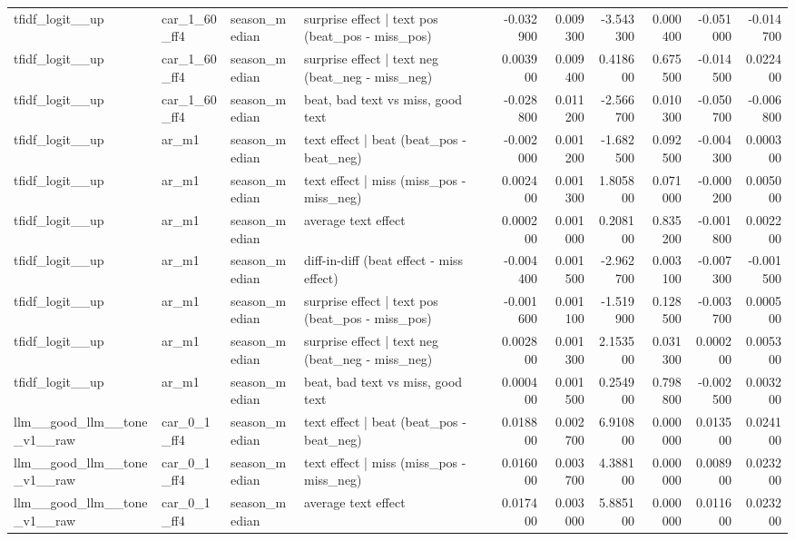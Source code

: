 \begin{table}
\begin{tabular}{llllrrrrrr}
tfidf\_logit\_\_up & car\_1\_60\_ff4 & season\_median & surprise effect | text pos (beat\_pos - miss\_pos) & -0.032900 & 0.009300 & -3.543300 & 0.000400 & -0.051000 & -0.014700 \\
tfidf\_logit\_\_up & car\_1\_60\_ff4 & season\_median & surprise effect | text neg (beat\_neg - miss\_neg) & 0.003900 & 0.009400 & 0.418600 & 0.675500 & -0.014500 & 0.022400 \\
tfidf\_logit\_\_up & car\_1\_60\_ff4 & season\_median & beat, bad text vs miss, good text & -0.028800 & 0.011200 & -2.566700 & 0.010300 & -0.050700 & -0.006800 \\
tfidf\_logit\_\_up & ar\_m1 & season\_median & text effect | beat  (beat\_pos - beat\_neg) & -0.002000 & 0.001200 & -1.682500 & 0.092500 & -0.004300 & 0.000300 \\
tfidf\_logit\_\_up & ar\_m1 & season\_median & text effect | miss  (miss\_pos - miss\_neg) & 0.002400 & 0.001300 & 1.805800 & 0.071000 & -0.000200 & 0.005000 \\
tfidf\_logit\_\_up & ar\_m1 & season\_median & average text effect & 0.000200 & 0.001000 & 0.208100 & 0.835200 & -0.001800 & 0.002200 \\
tfidf\_logit\_\_up & ar\_m1 & season\_median & diff-in-diff (beat effect - miss effect) & -0.004400 & 0.001500 & -2.962700 & 0.003100 & -0.007300 & -0.001500 \\
tfidf\_logit\_\_up & ar\_m1 & season\_median & surprise effect | text pos (beat\_pos - miss\_pos) & -0.001600 & 0.001100 & -1.519900 & 0.128500 & -0.003700 & 0.000500 \\
tfidf\_logit\_\_up & ar\_m1 & season\_median & surprise effect | text neg (beat\_neg - miss\_neg) & 0.002800 & 0.001300 & 2.153500 & 0.031300 & 0.000200 & 0.005300 \\
tfidf\_logit\_\_up & ar\_m1 & season\_median & beat, bad text vs miss, good text & 0.000400 & 0.001500 & 0.254900 & 0.798800 & -0.002500 & 0.003200 \\
llm\_\_good\_llm\_\_tone\_v1\_\_raw & car\_0\_1\_ff4 & season\_median & text effect | beat  (beat\_pos - beat\_neg) & 0.018800 & 0.002700 & 6.910800 & 0.000000 & 0.013500 & 0.024100 \\
llm\_\_good\_llm\_\_tone\_v1\_\_raw & car\_0\_1\_ff4 & season\_median & text effect | miss  (miss\_pos - miss\_neg) & 0.016000 & 0.003700 & 4.388100 & 0.000000 & 0.008900 & 0.023200 \\
llm\_\_good\_llm\_\_tone\_v1\_\_raw & car\_0\_1\_ff4 & season\_median & average text effect & 0.017400 & 0.003000 & 5.885100 & 0.000000 & 0.011600 & 0.023200 \\

\end{tabular}
\end{table}
